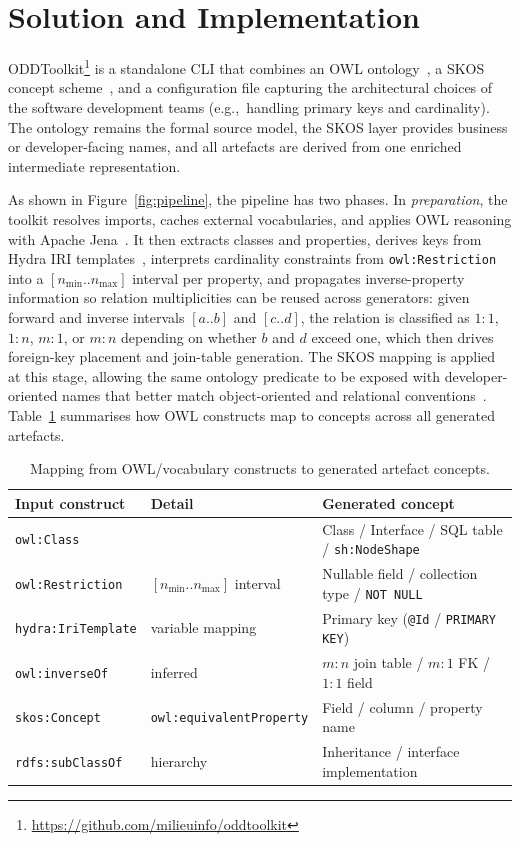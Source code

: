 \section{Solution and Implementation} \label{sec:solution}
ODDToolkit\footnote{\url{https://github.com/milieuinfo/oddtoolkit}} is a standalone CLI that combines an OWL ontology~\cite{GRAU2008309}, a SKOS concept scheme~\cite{miles2009skos}, and a configuration file capturing the architectural choices of the software development teams (e.g.,~handling primary keys and cardinality). The ontology remains the formal source model, the SKOS layer provides business or developer-facing names, and all artefacts are derived from one enriched intermediate representation.

As shown in Figure~\ref{fig:pipeline}, the pipeline has two phases. In \emph{preparation}, the toolkit resolves imports, caches external vocabularies, and applies OWL reasoning with Apache Jena~\cite{carroll2004jena}. It then extracts classes and properties, derives keys from Hydra IRI templates~\cite{lanthaler2013hydra}, interprets cardinality constraints from \texttt{owl:Restriction} into a $[n_{\min}..n_{\max}]$ interval per property, and propagates inverse-property information so relation multiplicities can be reused across generators: given forward and inverse intervals $[a..b]$ and $[c..d]$, the relation is classified as $1{:}1$, $1{:}n$, $m{:}1$, or $m{:}n$ depending on whether $b$ and $d$ exceed one, which then drives foreign-key placement and join-table generation. The SKOS mapping is applied at this stage, allowing the same ontology predicate to be exposed with developer-oriented names that better match object-oriented and relational conventions~\cite{7332450,10.1007/978-3-030-38919-2_35}. Table~\ref{tab:mapping} summarises how OWL constructs map to concepts across all generated artefacts.

\begin{table}[ht]
\caption{Mapping from OWL/vocabulary constructs to generated artefact concepts.}
\label{tab:mapping}
\centering
\begin{tabular}{lll}
\hline
\textbf{Input construct} & \textbf{Detail} & \textbf{Generated concept} \\
\hline
\texttt{owl:Class} & & Class / Interface / SQL table / \texttt{sh:NodeShape} \\
\texttt{owl:Restriction} & $[n_{\min}..n_{\max}]$ interval & Nullable field / collection type / \texttt{NOT NULL} \\
\texttt{hydra:IriTemplate} & variable mapping & Primary key (\texttt{@Id} / \texttt{PRIMARY KEY}) \\
\texttt{owl:inverseOf} & inferred & $m\!:\!n$ join table / $m\!:\!1$ FK / $1\!:\!1$ field \\
\texttt{skos:Concept} & \texttt{owl:equivalentProperty} & Field / column / property name \\
\texttt{rdfs:subClassOf} & hierarchy & Inheritance / interface implementation \\
\hline
\end{tabular}
\end{table}

